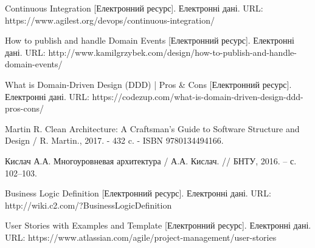 \begin{thebibliography}{00}
			Continuous Integration
      [Електронний ресурс]. Електронні дані.
			URL: https://www.agilest.org/devops/continuous-integration/
	
			How to publish and handle Domain Events
      [Електронний ресурс]. Електронні дані.
			URL: http://www.kamilgrzybek.com/design/how-to-publish-and-handle-domain-events/
	
			What is Domain-Driven Design (DDD) | Pros \& Cons
      [Електронний ресурс]. Електронні дані.
			URL: https://codezup.com/what-is-domain-driven-design-ddd-pros-cons/
	
			Martin R.
			Clean Architecture: A Craftsman's Guide to Software Structure and Design /
			R. Martin., 2017. - 432 c. - ISBN 9780134494166.
	
			Кислач А.А.
			Многоуровневая архитектура /
			А.А. Кислач. // БНТУ, 2016. – с. 102–103.
	
			Business Logic Definition
      [Електронний ресурс]. Електронні дані.
			URL: http://wiki.c2.com/?BusinessLogicDefinition
	
			User Stories with Examples and Template
      [Електронний ресурс]. Електронні дані.
			URL: https://www.atlassian.com/agile/project-management/user-stories


\end{thebibliography}
\endgroup

\clearpage
